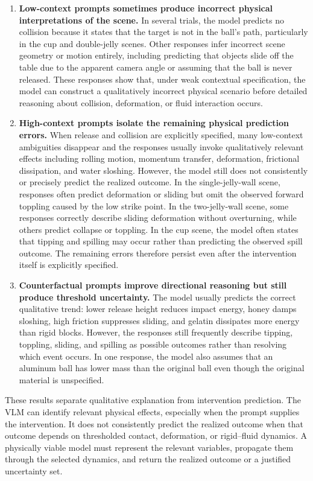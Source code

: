 \documentclass{article}
\begin{document}
\begin{enumerate}[leftmargin=*]
    \item 
    \textbf{Low-context prompts sometimes produce incorrect physical interpretations of the scene.} In several trials, the model predicts no collision because it states that the target is not in the ball’s path, particularly in the cup and double-jelly scenes. Other responses infer incorrect scene geometry or motion entirely, including predicting that objects slide off the table due to the apparent camera angle or assuming that the ball is never released. These responses show that, under weak contextual specification, the model can construct a qualitatively incorrect physical scenario before detailed reasoning about collision, deformation, or fluid interaction occurs.
    \item 
    \textbf{High-context prompts isolate the remaining physical prediction errors.} When release and collision are explicitly specified, many low-context ambiguities disappear and the responses usually invoke qualitatively relevant effects including rolling motion, momentum transfer, deformation, frictional dissipation, and water sloshing. However, the model still does not consistently or precisely predict the realized outcome. In the single-jelly-wall scene, responses often predict deformation or sliding but omit the observed forward toppling caused by the low strike point. In the two-jelly-wall scene, some responses correctly describe sliding deformation without overturning, while others predict collapse or toppling. In the cup scene, the model often states that tipping and spilling may occur rather than predicting the observed spill outcome. The remaining errors therefore persist even after the intervention itself is explicitly specified.
    \item 
    \textbf{Counterfactual prompts improve directional reasoning but still produce threshold uncertainty.} The model usually predicts the correct qualitative trend: lower release height reduces impact energy, honey damps sloshing, high friction suppresses sliding, and gelatin dissipates more energy than rigid blocks. However, the responses still frequently describe tipping, toppling, sliding, and spilling as possible outcomes rather than resolving which event occurs. In one response, the model also assumes that an aluminum ball has lower mass than the original ball even though the original material is unspecified.
\end{enumerate}

These results separate qualitative explanation from intervention prediction. The VLM can identify relevant physical effects, especially when the prompt supplies the intervention. It does not consistently predict the realized outcome when that outcome depends on thresholded contact, deformation, or rigid–fluid dynamics. A physically viable model must represent the relevant variables, propagate them through the selected dynamics, and return the realized outcome or a justified uncertainty set.
\end{document}

